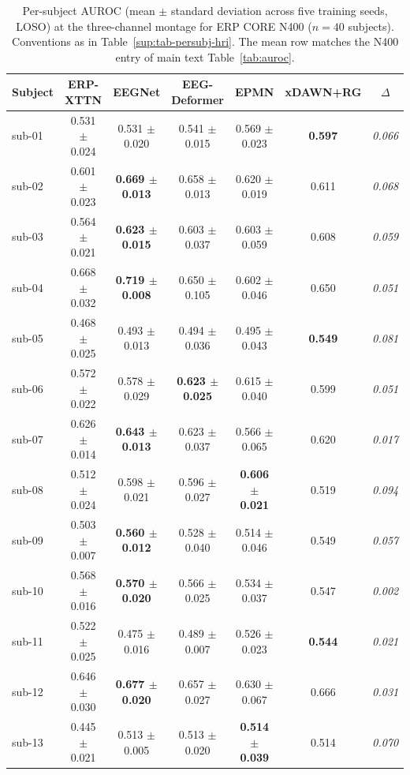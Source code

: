 \begin{table}[t]
\centering
\caption{%
Per-subject AUROC (mean $\pm$ standard deviation across five training seeds, LOSO) at the three-channel montage for ERP CORE N400 ($n = 40$ subjects). Conventions as in Table~\ref{sup:tab-persubj-hri}. The mean row matches the N400 entry of main text Table~\ref{tab:auroc}.%
}
\label{sup:tab-persubj-n400}
\begin{tabular}{lcccccc}
\toprule
Subject & ERP-XTTN & EEGNet & EEG-Deformer & EPMN & xDAWN+RG & $\Delta$ \\
\midrule
sub-01 & 0.531 $\pm$ 0.024 & 0.531 $\pm$ 0.020 & 0.541 $\pm$ 0.015 & 0.569 $\pm$ 0.023 & \textbf{0.597} & \textit{0.066} \\
sub-02 & 0.601 $\pm$ 0.023 & \textbf{0.669 $\pm$ 0.013} & 0.658 $\pm$ 0.013 & 0.620 $\pm$ 0.019 & 0.611 & \textit{0.068} \\
sub-03 & 0.564 $\pm$ 0.021 & \textbf{0.623 $\pm$ 0.015} & 0.603 $\pm$ 0.037 & 0.603 $\pm$ 0.059 & 0.608 & \textit{0.059} \\
sub-04 & 0.668 $\pm$ 0.032 & \textbf{0.719 $\pm$ 0.008} & 0.650 $\pm$ 0.105 & 0.602 $\pm$ 0.046 & 0.650 & \textit{0.051} \\
sub-05 & 0.468 $\pm$ 0.025 & 0.493 $\pm$ 0.013 & 0.494 $\pm$ 0.036 & 0.495 $\pm$ 0.043 & \textbf{0.549} & \textit{0.081} \\
sub-06 & 0.572 $\pm$ 0.022 & 0.578 $\pm$ 0.029 & \textbf{0.623 $\pm$ 0.025} & 0.615 $\pm$ 0.040 & 0.599 & \textit{0.051} \\
sub-07 & 0.626 $\pm$ 0.014 & \textbf{0.643 $\pm$ 0.013} & 0.623 $\pm$ 0.037 & 0.566 $\pm$ 0.065 & 0.620 & \textit{0.017} \\
sub-08 & 0.512 $\pm$ 0.024 & 0.598 $\pm$ 0.021 & 0.596 $\pm$ 0.027 & \textbf{0.606 $\pm$ 0.021} & 0.519 & \textit{0.094} \\
sub-09 & 0.503 $\pm$ 0.007 & \textbf{0.560 $\pm$ 0.012} & 0.528 $\pm$ 0.040 & 0.514 $\pm$ 0.046 & 0.549 & \textit{0.057} \\
sub-10 & 0.568 $\pm$ 0.016 & \textbf{0.570 $\pm$ 0.020} & 0.566 $\pm$ 0.025 & 0.534 $\pm$ 0.037 & 0.547 & \textit{0.002} \\
sub-11 & 0.522 $\pm$ 0.025 & 0.475 $\pm$ 0.016 & 0.489 $\pm$ 0.007 & 0.526 $\pm$ 0.023 & \textbf{0.544} & \textit{0.021} \\
sub-12 & 0.646 $\pm$ 0.030 & \textbf{0.677 $\pm$ 0.020} & 0.657 $\pm$ 0.027 & 0.630 $\pm$ 0.067 & 0.666 & \textit{0.031} \\
sub-13 & 0.445 $\pm$ 0.021 & 0.513 $\pm$ 0.005 & 0.513 $\pm$ 0.020 & \textbf{0.514 $\pm$ 0.039} & 0.514 & \textit{0.070} \\

\end{tabular}
\end{table}
